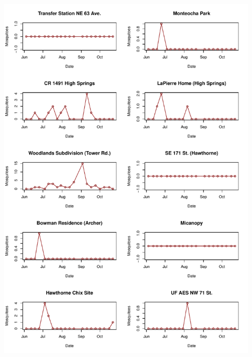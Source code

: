 \documentclass{article}
\begin{document}
\begin{center}
\includegraphics{mosq28oct13-013}

\end{center}
\end{document}
